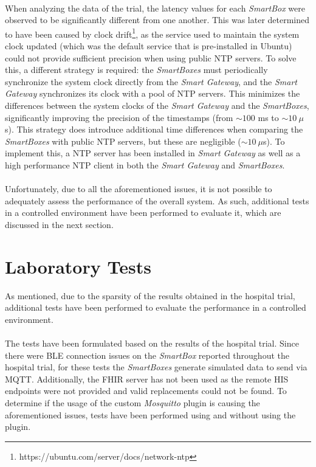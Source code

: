 \paragraph{} When analyzing the data of the trial, the latency values for each \textit{SmartBox} were observed to be significantly different from one another. This was later determined to have been caused by clock drift\footnote{https://ubuntu.com/server/docs/network-ntp}, as the service used to maintain the system clock updated (which was the default service that is pre-installed in Ubuntu) could not provide sufficient precision when using public \acf{NTP} servers. To solve this, a different strategy is required: the \textit{SmartBoxes} must periodically synchronize the system clock directly from the \textit{Smart Gateway}, and the \textit{Smart Gateway} synchronizes its clock with a pool of \acs{NTP} servers. This minimizes the differences between the system clocks of the \textit{Smart Gateway} and the \textit{SmartBoxes}, significantly improving the precision of the timestamps (from $\sim 100$ ms to $\sim 10\ \mu$s). This strategy does introduce additional time differences when comparing the \textit{SmartBoxes} with public \acs{NTP} servers, but these are negligible ($\sim 10\ \mu$s). To implement this, a \acs{NTP} server has been installed in \textit{Smart Gateway} as well as a high performance \acs{NTP} client in both the \textit{Smart Gateway} and \textit{SmartBoxes}. 

\paragraph{} Unfortunately, due to all the aforementioned issues, it is not possible to adequately assess the performance of the overall system. As such, additional tests in a controlled environment have been performed to evaluate it, which are discussed in the next section.

\section{Laboratory Tests}

As mentioned, due to the sparsity of the results obtained in the hospital trial, additional tests have been performed to evaluate the performance in a controlled environment.

\paragraph{} The tests have been formulated based on the results of the hospital trial. Since there were \acs{BLE} connection issues on the \textit{SmartBox} reported throughout the hospital trial, for these tests the \textit{SmartBoxes} generate simulated data to send via \acs{MQTT}. Additionally, the \acs{FHIR} server has not been used as the remote \acs{HIS} endpoints were not provided and valid replacements could not be found. To determine if the usage of the custom \textit{Mosquitto} plugin is causing the aforementioned issues, tests have been performed using and without using the plugin.

